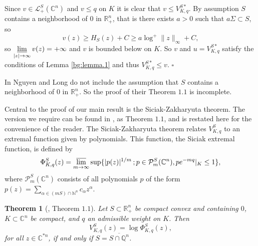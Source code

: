 \documentclass[a4paper,12pt,leqno,english]{article}
\numberwithin{equation}{section}
\newtheorem{theorem+}           {Theorem}      [section]
\newenvironment{theoremtx}[1]{\begin{theorem+}[#1]\sl}{\end{theorem+}\rm}
\newenvironment{proof}{\medbreak\noindent{\bf  Proof:}\rm}{\hfill$\square$\rm}
\begin{document}
\begin{proof}
Since $v \in \mathcal{L}^S_+(\mathbb{C}^n)$ and $v \leq q$ on $K$ it is clear that $v \leq V^{S*}_{K, q}$.
By assumption $S$ contains a neighborhood of $0$ in $\mathbb{R}^n_+$, that is there exists $a > 0$ such that $a\Sigma \subset S$, so
\begin{equation*}
    v(z)
    \geq
    H_S(z) + C
    \geq
    a \log^+ \|z\|_\infty + C,
\end{equation*}
so $\displaystyle\varliminf_{|z| \rightarrow \infty} v(z) = +\infty$ and $v$ is bounded below on $K$.
So $v$ and $u = V^{S*}_{K, q}$ satisfy the conditions of Lemma \ref{bg:lemma.1} and thus $V^{S*}_{K, q} \leq v$.
\end{proof}

In \cite{NguTan:2021} Nguyen and Long do not include the assumption that $S$ contains a neighborhood of $0$ in $\mathbb{R}^n_+$.
So the proof of their Theorem $1.1$ is incomplete.

Central to the proof of our main result is the Siciak-Zakharyuta theorem.
The version we require can be found in \cite{MagSigSig:2023}, as Theorem $1.1$, and is restated here for the convenience of the reader.
The Siciak-Zakharyuta theorem relates $V^S_{K, q}$ to an extremal function given by polynomials.
This function, the Siciak extremal function, is defined by
\begin{equation*}
    \Phi^S_{K, q}(z)
    =
    \varlimsup_{m \rightarrow \infty} \sup\{|p(z)|^{1/m}\,; p \in \mathcal{P}^S_m(\mathbb{C}^n), p e^{-mq}|_K \leq 1\},
\end{equation*}
where $\mathcal{P}^S_m(\mathbb{C}^n)$ consists of all polynomials $p$ of the form
    $p(z) = \sum\limits_{\alpha \in (mS) \cap \mathbb{N}^n} c_\alpha z^\alpha$.
\begin{theoremtx}{\cite{MagSigSig:2023}, Theorem $1.1$}
\label{bg:thm.2}
Let
    $S \subset \mathbb{R}_+^n$ be compact convex and containing $0$,
    $K \subset \mathbb{C}^n$ be compact, and
    $q$ an admissible weight on $K$.
Then
\begin{equation*}
    V^S_{K, q}(z)
    =
    \log \Phi^S_{K, q}(z),
\end{equation*}
for all $z \in \mathbb{C}^{*n}$, if and only if $S = \overline{S \cap \mathbb{Q}^n}$.
\end{theoremtx}
\end{document}
